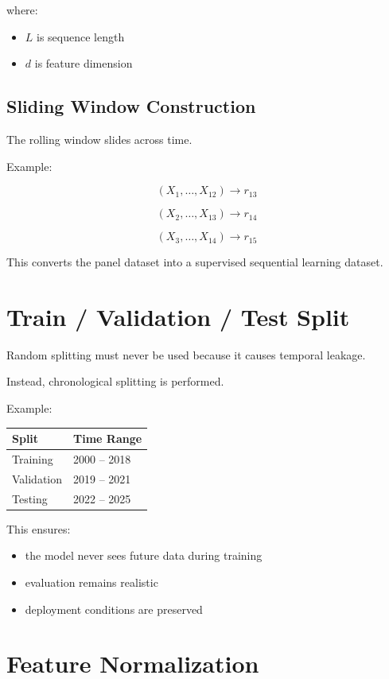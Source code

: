 \documentclass[11pt]{article}
\begin{document}
where:
\begin{itemize}
    \item $L$ is sequence length
    \item $d$ is feature dimension
\end{itemize}

\subsection{Sliding Window Construction}

The rolling window slides across time.

Example:

\[
(X_1,\dots,X_{12}) \rightarrow r_{13}
\]

\[
(X_2,\dots,X_{13}) \rightarrow r_{14}
\]

\[
(X_3,\dots,X_{14}) \rightarrow r_{15}
\]

This converts the panel dataset into a supervised sequential learning dataset.

\section{Train / Validation / Test Split}

Random splitting must never be used because it causes temporal leakage.

Instead, chronological splitting is performed.

Example:

\begin{center}
\begin{tabular}{ll}
\toprule
Split & Time Range \\
\midrule
Training & 2000 -- 2018 \\
Validation & 2019 -- 2021 \\
Testing & 2022 -- 2025 \\
\bottomrule
\end{tabular}
\end{center}

This ensures:
\begin{itemize}
    \item the model never sees future data during training
    \item evaluation remains realistic
    \item deployment conditions are preserved
\end{itemize}

\section{Feature Normalization}
\end{document}
